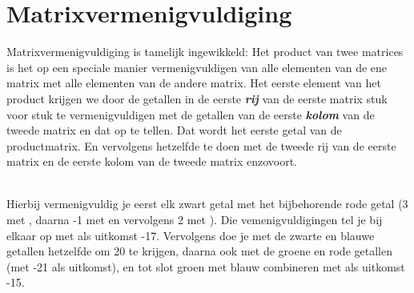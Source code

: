 \documentclass[hidelinks, a4wide, 12pt,  twoside]{book}
\begin{document}
\section{Matrixvermenigvuldiging}
Matrixvermenigvuldiging is tamelijk ingewikkeld:
{Het product van twee matrices is 
	het op een speciale manier vermenigvuldigen van  alle elementen van de ene matrix met alle elementen van de andere matrix.} 
Het eerste element van het product krijgen we door de getallen in de eerste \textit{\textbf{rij}} van de eerste matrix stuk voor stuk te vermenigvuldigen met de getallen van de eerste \textit{\textbf{kolom}} van de tweede matrix en dat op te tellen. Dat wordt het eerste getal van de productmatrix. En vervolgens hetzelfde te doen met de tweede rij van de eerste matrix en de eerste kolom van de tweede matrix enzovoort. \\ \\

Hierbij vermenigvuldig je eerst elk zwart getal  met het bijbehorende rode getal (3 met , daarna -1 met   en vervolgens 2 met ). Die vemenigvuldigingen  tel je bij elkaar  op met als uitkomst -17. Vervolgens doe je met de zwarte en blauwe getallen  hetzelfde om 20 te krijgen, daarna ook met de groene en rode getallen  (met -21 als uitkomst), en tot slot groen met blauw combineren met als uitkomst -15.
\end{document}

